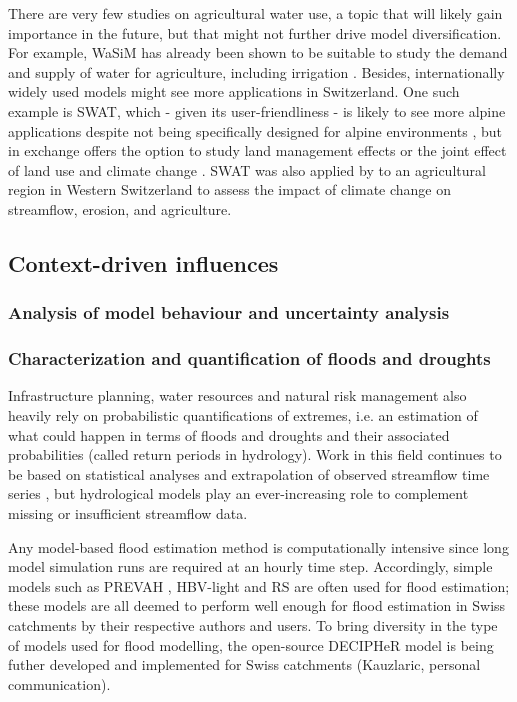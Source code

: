 \documentclass[10pt,a4paper]{article}
\begin{document}
There are very few studies on agricultural water use, a topic that will likely gain importance in the future, but that might not further drive model diversification. For example, WaSiM has already been shown to be suitable to study the demand and supply of water for agriculture, including irrigation \citep{Fuhrer2012}. Besides, internationally widely used models might see more applications in Switzerland. One such example is SWAT, which - given its user-friendliness \citep{Abbaspour2007} - is likely to see more alpine applications despite not being specifically designed for alpine environments \citep{Rahman2014, Andrianaki2019}, but in exchange offers the option to study land management effects \citep{Zarrineh2018} or the joint effect of land use and climate change \citep{Rahman2015}. SWAT was also applied by \citet{Zarrineh2020} to an agricultural region in Western Switzerland to assess the impact of climate change on streamflow, erosion, and agriculture.


\subsection{Context-driven influences}
\label{sec:application:context}


\subsubsection{Analysis of model behaviour and uncertainty analysis}
\label{sec:application:uncertainty}


\subsubsection{Characterization and quantification of floods and droughts}
\label{sec:application:floodsdroughts}

Infrastructure planning, water resources and natural risk management also heavily rely on probabilistic quantifications of extremes, i.e. an estimation of what could happen in terms of floods and droughts and their associated probabilities (called return periods in hydrology). Work in this field continues to be based on statistical analyses and extrapolation of observed streamflow time series \citep{Brunner2018, Asadi20108}, but hydrological models play an ever-increasing role to complement missing or insufficient streamflow data.

Any model-based flood estimation method is computationally intensive since long model simulation runs are required at an hourly time step. Accordingly, simple models such as PREVAH \citep{Viviroli_2009, Viviroli2009c, Felder2017}, HBV-light \citep{Sikorska2017, Brunner_2019a, Sikorska-Senoner2020} and  RS \citep{Bieri2013, Zeimetz2017, Zeimetz2018} are often used for flood estimation; these models are all deemed to perform well enough for flood estimation in Swiss catchments by their respective authors and users. To bring diversity in the type of models used for flood modelling, the open-source DECIPHeR model is being futher developed and implemented for Swiss catchments (Kauzlaric, personal communication).
\end{document}
